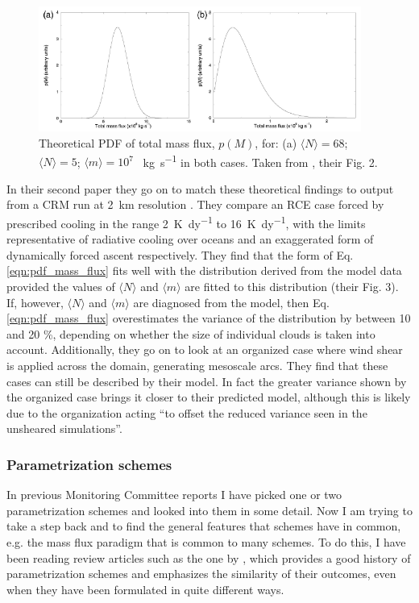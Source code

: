 \documentclass[11pt,a4paper]{article}
\begin{document}
\begin{figure}[hbp!]
    \centering
    \includegraphics[width=400px]{figures/CraigAndCohenFig2}
    \caption{Theoretical PDF of total mass flux, $p(M)$, for: (a) $\langle N \rangle = 68$; $\langle N \rangle = 5$; $\langle m \rangle = 10^7$ \SI{}{kg.s^{-1}} in both cases. Taken from \cite{craig2006fluctuations}, their Fig. 2.}
    \label{fig:pdf_mass_flux}
\end{figure}

In their second paper they go on to match these theoretical findings to output from a CRM run at \SI{2}{km} resolution \parencite{cohen2006fluctuations}. They compare an RCE case forced by prescribed cooling in the range \SI{2}{K.dy^{-1}} to \SI{16}{K.dy^{-1}}, with the limits representative of radiative cooling over oceans and an exaggerated form of dynamically forced ascent respectively. They find that the form of Eq. \ref{eqn:pdf_mass_flux} fits well with the distribution derived from the model data provided the values of $\langle N \rangle$ and $\langle m \rangle$ are fitted to this distribution (their Fig. 3). If, however, $\langle N \rangle$ and $\langle m \rangle$  are diagnosed from the model, then Eq. \ref{eqn:pdf_mass_flux} overestimates the variance of the distribution by between 10 and 20 \%, depending on whether the size of individual clouds is taken into account. Additionally, they go on to look at an organized case where wind shear is applied across the domain, generating mesoscale arcs. They find that these cases can still be described by their model. In fact the greater variance shown by the organized case brings it closer to their predicted model, although this is likely due to the organization acting ``to offset the reduced variance seen in the unsheared simulations''.


\subsubsection{Parametrization schemes}
In previous Monitoring Committee reports I have picked one or two parametrization schemes and looked into them in some detail. Now I am trying to take a step back and to find the general features that schemes have in common, e.g. the mass flux paradigm that is common to many schemes. To do this, I have been reading review articles such as the one by \cite{arakawa2004cumulus}, which provides a good history of parametrization schemes and emphasizes the similarity of their outcomes, even when they have been formulated in quite different ways. 
\end{document}
